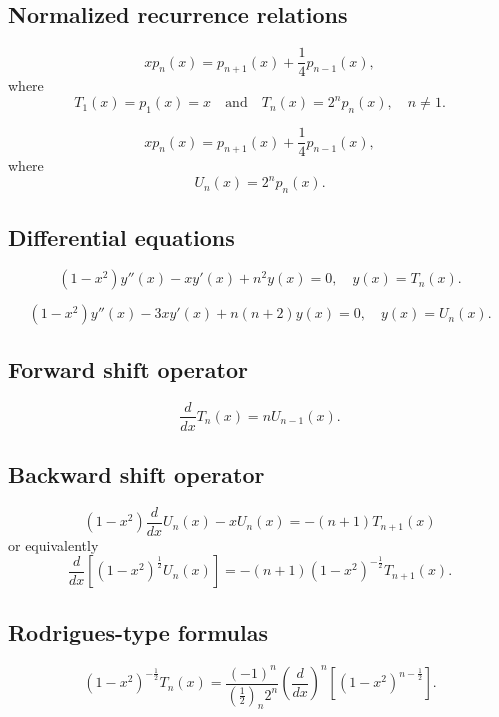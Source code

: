 \documentclass[envcountchap,graybox]{svmono}
\begin{document}
\subsection*{Normalized recurrence relations}
\begin{equation}
\label{NormRecChebyshevI}
xp_n(x)=p_{n+1}(x)+\frac{1}{4}p_{n-1}(x),
\end{equation}
where
$$T_1(x)=p_1(x)=x\quad\textrm{and}\quad T_n(x)=2^np_n(x),\quad n\neq 1.$$

\begin{equation}
\label{NormRecChebyshevII}
xp_n(x)=p_{n+1}(x)+\frac{1}{4}p_{n-1}(x),
\end{equation}
where
$$U_n(x)=2^np_n(x).$$

\subsection*{Differential equations}
\begin{equation}
\label{dvChebyshevI}
(1-x^2)y''(x)-xy'(x)+n^2y(x)=0,\quad y(x)=T_n(x).
\end{equation}

\begin{equation}
\label{dvChebyshevII}
(1-x^2)y''(x)-3xy'(x)+n(n+2)y(x)=0,\quad y(x)=U_n(x).
\end{equation}

\subsection*{Forward shift operator}
\begin{equation}
\label{shift1Chebyshev}
\frac{d}{dx}T_n(x)=nU_{n-1}(x).
\end{equation}

\subsection*{Backward shift operator}
\begin{equation}
\label{shift2ChebyshevI}
(1-x^2)\frac{d}{dx}U_n(x)-xU_n(x)=-(n+1)T_{n+1}(x)
\end{equation}
or equivalently
\begin{equation}
\label{shift2ChebyshevII}
\frac{d}{dx}\left[\left(1-x^2\right)^{\frac{1}{2}}U_n(x)\right]
=-(n+1)\left(1-x^2\right)^{-\frac{1}{2}}T_{n+1}(x).
\end{equation}

\subsection*{Rodrigues-type formulas}
\begin{equation}
\label{RodChebyshevI}
(1-x^2)^{-\frac{1}{2}}T_n(x)=\frac{(-1)^n}{(\frac{1}{2})_n2^n}
\left(\frac{d}{dx}\right)^n\left[(1-x^2)^{n-\frac{1}{2}}\right].
\end{equation}
\end{document}
